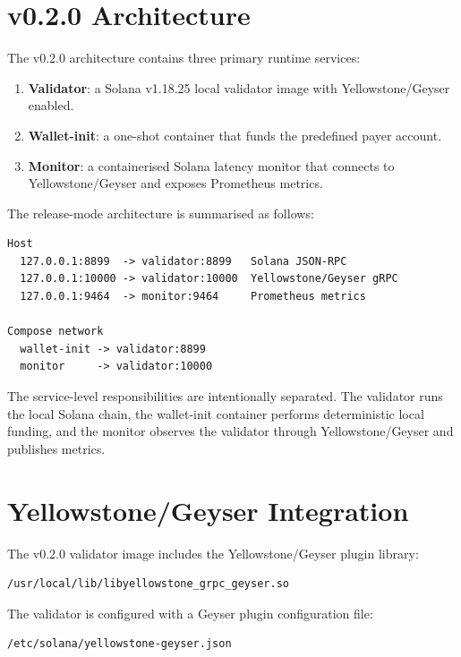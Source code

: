 \documentclass[11pt,a4paper]{article}
\begin{document}
\section{v0.2.0 Architecture}

The v0.2.0 architecture contains three primary runtime services:

\begin{enumerate}[leftmargin=2em]
  \item \textbf{Validator}: a Solana v1.18.25 local validator image with Yellowstone/Geyser enabled.
  \item \textbf{Wallet-init}: a one-shot container that funds the predefined payer account.
  \item \textbf{Monitor}: a containerised Solana latency monitor that connects to Yellowstone/Geyser and exposes Prometheus metrics.
\end{enumerate}

The release-mode architecture is summarised as follows:

\begin{lstlisting}
Host
  127.0.0.1:8899  -> validator:8899   Solana JSON-RPC
  127.0.0.1:10000 -> validator:10000  Yellowstone/Geyser gRPC
  127.0.0.1:9464  -> monitor:9464     Prometheus metrics

Compose network
  wallet-init -> validator:8899
  monitor     -> validator:10000
\end{lstlisting}

The service-level responsibilities are intentionally separated. The validator runs the local Solana chain, the wallet-init container performs deterministic local funding, and the monitor observes the validator through Yellowstone/Geyser and publishes metrics.

\section{Yellowstone/Geyser Integration}

The v0.2.0 validator image includes the Yellowstone/Geyser plugin library:

\begin{lstlisting}
/usr/local/lib/libyellowstone_grpc_geyser.so
\end{lstlisting}

The validator is configured with a Geyser plugin configuration file:

\begin{lstlisting}
/etc/solana/yellowstone-geyser.json
\end{lstlisting}
\end{document}
